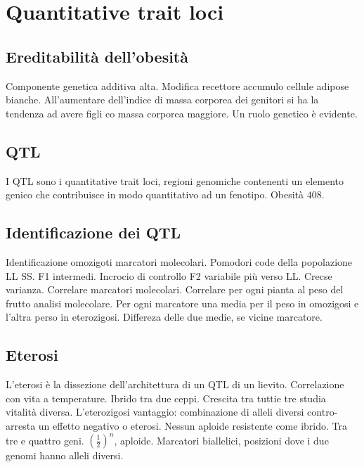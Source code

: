 \section{Quantitative trait loci}

	\subsection{Ereditabilit\`a dell'obesit\`a}
	Componente genetica additiva alta.
	Modifica recettore accumulo cellule adipose bianche.
	All'aumentare dell'indice di massa corporea dei genitori si ha la tendenza ad avere figli co massa corporea maggiore.
	Un ruolo genetico \`e evidente.

	\subsection{QTL}
	I QTL sono i quantitative trait loci, regioni genomiche contenenti un elemento genico che contribuisce in modo quantitativo ad un fenotipo.
	Obesit\`a $408$.


	\subsection{Identificazione dei QTL}
	Identificazione omozigoti marcatori molecolari.
	Pomodori code della popolazione LL SS.
	F1 intermedi.
	Incrocio di controllo F2 variabile pi\`u verso LL.
	Crecse varianza.
	Correlare marcatori molecolari.
	Correlare per ogni pianta al peso del frutto analisi molecolare.
	Per ogni marcatore una media per il peso in omozigosi e l'altra perso in eterozigosi.
	Differeza delle due medie, se vicine marcatore.

	\subsection{Eterosi}
	L'eterosi \`e la dissezione dell'architettura di un QTL di un lievito.
	Correlazione con vita a temperature.
	Ibrido tra due ceppi.
	Crescita tra tuttie tre studia vitalit\`a diversa.
	L'eterozigosi vantaggio: combinazione di alleli diversi contro-arresta un effetto negativo o eterosi.
	Nessun aploide resistente come ibrido.
	Tra tre e quattro geni.
	$(\frac{1}{2})^n$, aploide.
	Marcatori biallelici, posizioni dove i due genomi hanno alleli diversi.
